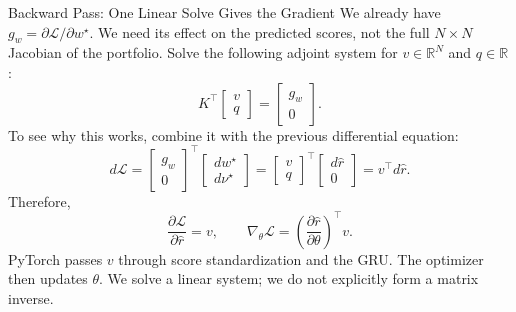\documentclass[aspectratio=169,xcolor=dvipsnames]{beamer}
\begin{document}
\begin{frame}{Backward Pass: One Linear Solve Gives the Gradient}
    \small
    We already have $g_w=\partial\mathcal L/\partial w^\star$.
    We need its effect on the predicted scores, not the full
    $N\times N$ Jacobian of the portfolio.
    Solve the following adjoint system for $v\in\mathbb R^N$ and $q\in\mathbb R$:
    \[
    K^\top\begin{bmatrix}v\\q\end{bmatrix}
    =\begin{bmatrix}g_w\\0\end{bmatrix}.
    \]
    To see why this works, combine it with the previous differential equation:
    \[
    d\mathcal L
    =\begin{bmatrix}g_w\\0\end{bmatrix}^{\!\top}
      \begin{bmatrix}dw^\star\\d\nu^\star\end{bmatrix}
    =\begin{bmatrix}v\\q\end{bmatrix}^{\!\top}
      \begin{bmatrix}d\hat r\\0\end{bmatrix}
    =v^\top d\hat r.
    \]
    Therefore,
    \[
    \boxed{\frac{\partial\mathcal L}{\partial\hat r}=v,\qquad
    \nabla_\theta\mathcal L
    =\left(\frac{\partial\hat r}{\partial\theta}\right)^\top v.}
    \]
    PyTorch passes $v$ through score standardization and the GRU.
    The optimizer then updates $\theta$. We solve a linear system;
    we do not explicitly form a matrix inverse.
\end{frame}
\end{document}
